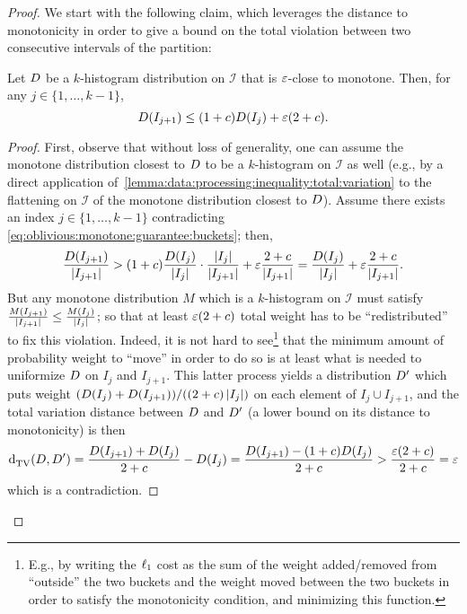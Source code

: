 \begin{proof}
    We start with the following claim, which leverages the distance to monotonicity in order to give a bound on the total violation between two consecutive intervals of the partition:
    \begin{claim}\label{claim:oblivious:monotone:guarantee:buckets}
      Let $\D$ be a $k$-histogram distribution on $\mathcal{I}$ that is $\eps$-close to monotone. Then, for any $j\in\{1,\dots,k-1\}$,
      \begin{equation}\label{eq:oblivious:monotone:guarantee:buckets}
	      D(I_{j+1}) \leq (1+c)D(I_{j})+\eps(2+c).
      \end{equation}
    \end{claim}
    \begin{proof}
    First, observe that without loss of generality, one can assume the monotone distribution closest to $\D$ to be a $k$-histogram on $\mathcal{I}$ as well (e.g., by a direct application of~\autoref{lemma:data:processing:inequality:total:variation} to the flattening on $\mathcal{I}$ of the monotone distribution closest to $\D$). Assume there exists an index $j\in\{1,\dots,k-1\}$ contradicting \eqref{eq:oblivious:monotone:guarantee:buckets}; then,
    \[
	    \frac{\D(I_{j+1})}{\abs{I_{j+1}}} > (1+c)\frac{\D(I_{j})}{\abs{I_{j}}}\cdot\frac{\abs{I_{j}}}{\abs{I_{j+1}}} + \eps\frac{ 2+c }{ \abs{I_{j+1}}  } = \frac{\D(I_{j})}{\abs{I_{j}}} +   \eps\frac{ 2+c }{ \abs{I_{j+1}}  }.
    \]
    But any  monotone distribution $M$ which is a $k$-histogram on $\mathcal{I}$ must satisfy $\frac{M(I_{j+1})}{\abs{I_{j+1}}} \leq \frac{M(I_{j})}{\abs{I_{j}}}$; so that at least  $\eps(2+c)$ total {weight} has to be ``redistributed'' to fix this violation.     Indeed, it is not hard to see\footnote{E.g., by writing the $\lp[1]$ cost as the sum of the weight added/removed from ``outside'' the two buckets and the {weight} moved between the two buckets in order to satisfy the monotonicity condition, and minimizing this function.}
     that the minimum amount of probability weight to ``move'' in order to do so is at least what is needed to uniformize $\D$ on $I_j$ and $I_{j+1}$. 
    This latter process yields a distribution $\D^\prime$  
    which puts weight $(\D(I_j)+\D(I_{j+1}))/((2+c)\abs{I_j})$
    on each element of $I_j\cup I_{j+1}$, and the total variation distance between $\D$ and $\D^\prime$ (a lower bound on its distance to monotonicity) is then
    \[
	    \totalvardist{\D}{\D^\prime}=\frac{\D(I_{j+1})+\D(I_j)}{2+c}-\D(I_j) = \frac{\D(I_{j+1})-(1+c)\D(I_j)}{2+c} > \frac{\eps(2+c)}{2+c}=\eps
    \]
    which is a contradiction.

\end{proof}
\end{proof}
